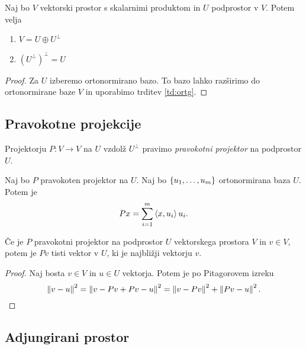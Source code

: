 \documentclass[12pt, a4paper]{article}
\begin{document}
\obvs

\begin{izrek}
Naj bo $V$ vektorski prostor s skalarnimi produktom in $U$ podprostor v $V$. Potem velja

\begin{enumerate}[label=\roman*)]
\item $V=U\oplus U^\bot$
\item $\left(U^\bot\right)^\bot=U$
\end{enumerate}
\end{izrek}

\begin{proof}
Za $U$ izberemo ortonormirano bazo. To bazo lahko razširimo do ortonormirane baze $V$ in uporabimo trditev \ref{td:ortg}.
\end{proof}

\newpage

\subsection{Pravokotne projekcije}

\begin{definicija}
Projektorju $P\colon V\to V$ na $U$ vzdolž $U^\bot$ pravimo \emph{pravokotni projektor} na podprostor $U$.
\end{definicija}

\begin{opomba}
Naj bo $P$ pravokoten projektor na $U$. Naj bo $\left\{u_1,\dots,u_m\right\}$ ortonormirana baza $U$. Potem je
\[
Px=\sum_{i=1}^m\left\langle x,u_i\right\rangle u_i.
\]
\end{opomba}

\begin{izrek}
Če je $P$ pravokotni projektor na podprostor $U$ vektorskega prostora $V$ in $v\in V$, potem je $Pv$ tisti vektor v $U$, ki je najbližji vektorju $v$.
\end{izrek}

\begin{proof}
Naj bosta $v\in V$ in $u\in U$ vektorja. Potem je po Pitagorovem izreku
\[
\left\lVert v-u\right\rVert^2=\left\lVert v-Pv+Pv-u\right\rVert^2=\left\lVert v-Pv\right\rVert^2+\left\lVert Pv-u\right\rVert^2.\qedhere
\]
\end{proof}

\newpage

\subsection{Adjungirani prostor}
\end{document}
